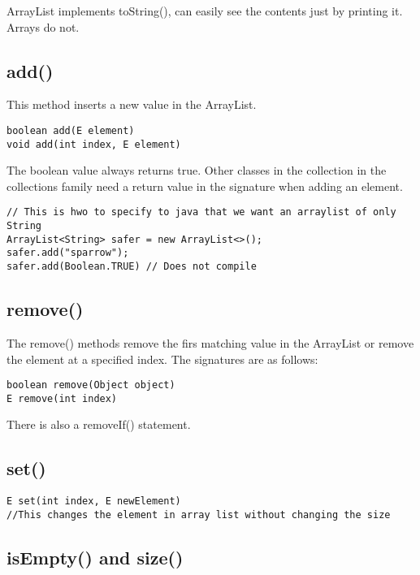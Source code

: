 \documentclass[a4paper]{report}   %
\begin{document}
ArrayList implements toString(), can easily see the contents just by printing it. Arrays do not.

\subsection{add()}

This method inserts a new value in the ArrayList.

\begin{lstlisting}
boolean add(E element)
void add(int index, E element)
\end{lstlisting}

The boolean value always returns true. Other classes in the collection in the collections family need a return value in the signature when adding an element.

\begin{lstlisting}
// This is hwo to specify to java that we want an arraylist of only String
ArrayList<String> safer = new ArrayList<>();
safer.add("sparrow");
safer.add(Boolean.TRUE) // Does not compile

\end{lstlisting}

\subsection{remove()}

The remove() methods remove the firs matching value in the ArrayList or remove the element at a specified index. The signatures are as follows:

\begin{lstlisting}
boolean remove(Object object)
E remove(int index)
\end{lstlisting}

There is also a removeIf() statement.

\subsection{set()}

\begin{lstlisting}
E set(int index, E newElement)
//This changes the element in array list without changing the size
\end{lstlisting}

\subsection{isEmpty() and size()}
\end{document}
